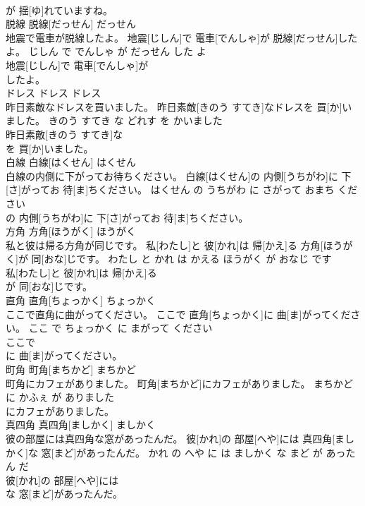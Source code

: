 \documentclass[8pt]{extreport}
\begin{document}
\begin{CJK}{UTF8}{min}
\\	が 揺[ゆ]れていますね。			
\\	脱線	脱線[だっせん]	だっせん	
\\	地震で電車が脱線したよ。	地震[じしん]で 電車[でんしゃ]が 脱線[だっせん]したよ。	じしん で でんしゃ が だっせん した よ	
\\	地震[じしん]で 電車[でんしゃ]が
\\	したよ。			
\\	ドレス	ドレス	ドレス	
\\	昨日素敵なドレスを買いました。	昨日素敵[きのう すてき]なドレスを 買[か]いました。	きのう すてき な どれす を かいました	
\\	昨日素敵[きのう すてき]な
\\	を 買[か]いました。			
\\	白線	白線[はくせん]	はくせん	
\\	白線の内側に下がってお待ちください。	白線[はくせん]の 内側[うちがわ]に 下[さ]がってお 待[ま]ちください。	はくせん の うちがわ に さがって おまち ください	
\\	の 内側[うちがわ]に 下[さ]がってお 待[ま]ちください。			
\\	方角	方角[ほうがく]	ほうがく	
\\	私と彼は帰る方角が同じです。	私[わたし]と 彼[かれ]は 帰[かえ]る 方角[ほうがく]が 同[おな]じです。	わたし と かれ は かえる ほうがく が おなじ です	
\\	私[わたし]と 彼[かれ]は 帰[かえ]る
\\	が 同[おな]じです。			
\\	直角	直角[ちょっかく]	ちょっかく	
\\	ここで直角に曲がってください。	ここで 直角[ちょっかく]に 曲[ま]がってください。	ここ で ちょっかく に まがって ください	
\\	ここで
\\	に 曲[ま]がってください。			
\\	町角	町角[まちかど]	まちかど	
\\	町角にカフェがありました。	町角[まちかど]にカフェがありました。	まちかど に かふぇ が ありました	
\\	にカフェがありました。			
\\	真四角	真四角[ましかく]	ましかく	
\\	彼の部屋には真四角な窓があったんだ。	彼[かれ]の 部屋[へや]には 真四角[ましかく]な 窓[まど]があったんだ。	かれ の へや に は ましかく な まど が あった ん だ	
\\	彼[かれ]の 部屋[へや]には
\\	な 窓[まど]があったんだ。			

\end{CJK}
\end{document}
